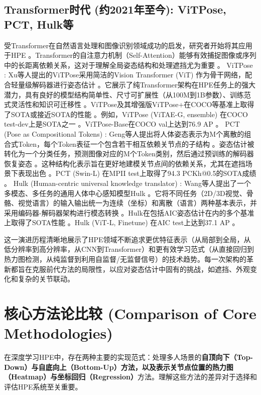 \documentclass[12pt,a4paper]{article}
\begin{document}
\subsection{Transformer时代 (约2021年至今): ViTPose, PCT, Hulk等}
受Transformer在自然语言处理和图像识别领域成功的启发，研究者开始将其应用于HPE \cite{Wang2023TransformerSurvey}。Transformer的自注意力机制（Self-Attention）能够有效捕捉图像或序列中的长距离依赖关系，这对于理解全局姿态结构和处理遮挡尤为重要 \cite{Wang2023TransformerSurvey}。
ViTPose \cite{Xu2022ViTPose}: Xu等人提出的ViTPose采用简洁的Vision Transformer (ViT) 作为骨干网络，配合轻量级解码器进行姿态估计 \cite{Xu2022ViTPose}。它展示了纯Transformer架构在HPE任务上的强大潜力，具有良好的模型结构简单性、尺寸可扩展性（从100M到1B参数）、训练范式灵活性和知识可迁移性 \cite{Xu2022ViTPose}。ViTPose及其增强版ViTPose+在COCO等基准上取得了SOTA或接近SOTA的性能 \cite{Xu2022ViTPose}。例如，ViTPose (ViTAE-G, ensemble) 在COCO test-dev上是SOTA之一 \cite{Xu2022ViTPose}。ViTPose-Base在COCO val上达到76.9 AP \cite{Sun2023SHaRPose}。
PCT (Pose as Compositional Tokens) \cite{Geng2023PCT}: Geng等人提出将人体姿态表示为M个离散的组合式Token，每个Token表征一个包含若干相互依赖关节点的子结构 \cite{Geng2023PCT}。姿态估计被转化为一个分类任务，预测图像对应的M个Token类别，然后通过预训练的解码器恢复姿态 \cite{Geng2023PCT}。这种结构化表示旨在更好地建模关节点间的依赖关系，尤其在遮挡场景下表现出色 \cite{Geng2023PCT}。PCT (Swin-L) 在MPII test上取得了94.3 PCKh@0.5的SOTA成绩 \cite{Geng2023PCT}。
Hulk (Human-centric universal knowledge translator) \cite{Wang2023Hulk}: Wang等人提出了一个多模态、多任务的通用人体中心感知模型Hulk \cite{Wang2023Hulk}。它将不同任务（2D/3D视觉、骨骼、视觉语言）的输入输出统一为连续（坐标）和离散（语言）两种基本表示，并采用编码器-解码器架构进行模态转换 \cite{Wang2023Hulk}。Hulk在包括AIC姿态估计在内的多个基准上取得了SOTA性能 \cite{Wang2023Hulk}。Hulk (ViT-L, Finetune) 在AIC test上达到37.1 AP \cite{Wang2023HulkCVPR}。

这一演进历程清晰地展示了HPE领域不断追求更优特征表示（从局部到全局，从低分辨率到高分辨率，从CNN到Transformer）和更有效学习范式（从直接回归到热力图检测，从纯监督到利用自监督/无监督信号）的技术趋势。每一次架构的革新都旨在克服前代方法的局限性，以应对姿态估计中固有的挑战，如遮挡、外观变化和复杂的关节联动。

\section{核心方法论比较 (Comparison of Core Methodologies)}
在深度学习HPE中，存在两种主要的实现范式：处理多人场景的\textbf{自顶向下（Top-Down）与自底向上（Bottom-Up）方法，以及表示关节点位置的热力图（Heatmap）与坐标回归（Regression）}方法。理解这些方法的差异对于选择和评估HPE系统至关重要。
\end{document}
